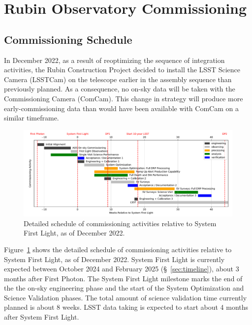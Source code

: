 \section{Rubin Observatory Commissioning}
\label{sec:commissioning}

\subsection{Commissioning Schedule}
\label{ssec:commissioning-schedule}


In December 2022, as a result of reoptimizing the sequence of integration activities, the Rubin Construction Project decided to install the LSST Science Camera (LSSTCam) on the telescope earlier in the assembly sequence than previously planned. 
As a consequence, no on-sky data will be taken with the Commissioning Camera (ComCam). 
This change in strategy will produce more early-commissioning data than would have been available with ComCam on a similar timeframe. 

\begin{figure}[htb]
\centering
\includegraphics[width=0.95\linewidth]{figures/rubinobs_on-sky_commissioning_gantt.pdf}
\caption{Detailed schedule of commissioning activities relative to System First Light, as of December 2022.}
\label{fig:commissioning-gantt}
\end{figure}

Figure~\ref{fig:commissioning-gantt} shows the detailed schedule of commissioning activities relative to System First Light, as of December 2022.
System First Light is currently expected between October 2024 and February 2025 (\S~\ref{sec:timeline}), about 3 months after First Photon. 
The System First Light milestone marks the end of the the on-sky engineering phase and the start of the System Optimization and Science Validation phases. 
The total amount of science validation time currently planned is about 8 weeks.  
LSST data taking is expected to start about 4 months after System First Light.

